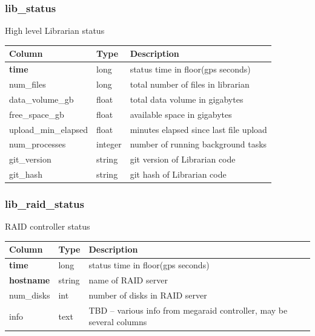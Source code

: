 \documentclass{article}
\begin{document}
\subsubsection{lib\_status}
High level Librarian status
\begin{center}
 \begin{tabular}{| p{4cm} | p{2cm} | p{10cm} |}
\hline
 {\bf Column} & {\bf Type}  & {\bf Description} \\ [0.5ex]  \hline\hline
\textbf{time} & long & status time in floor(gps seconds) \\ \hline
num\_files & long & total number of files in librarian  \\\hline
data\_volume\_gb & float & total data volume in gigabytes  \\\hline
free\_space\_gb & float & available space in gigabytes  \\\hline
upload\_min\_elapsed & float & minutes elapsed since last file upload \\\hline
num\_processes & integer & number of running background tasks  \\\hline
git\_version & string & git version of Librarian code  \\\hline
git\_hash & string & git hash of Librarian code  \\\hline
\end{tabular}
\end{center}

\subsubsection{lib\_raid\_status}
RAID controller status
\begin{center}
 \begin{tabular}{| p{4cm} | p{2cm} | p{10cm} |}
\hline
 {\bf Column} & {\bf Type}  & {\bf Description} \\ [0.5ex]  \hline\hline
\textbf{time} & long & status time in floor(gps seconds) \\ \hline
\textbf{hostname} & string & name of RAID server \\ \hline
num\_disks & int & number of disks in RAID server  \\\hline
info & text & TBD -- various info from megaraid controller, may be several columns \\\hline
\end{tabular}
\end{center}
\end{document}
